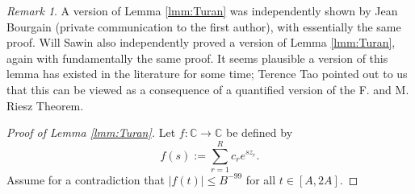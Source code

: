 \documentclass[12pt]{amsart}
\theoremstyle{plain}
\theoremstyle{definition}
\theoremstyle{remark}
\newtheorem{remark}[theorem]{Remark}
\begin{document}
%
%
%
%
\begin{remark}
A version of Lemma \ref{lmm:Turan} was independently shown by Jean Bourgain (private communication to the first author), with essentially the same proof. Will Sawin \cite{SawMO} also independently proved a version of Lemma \ref{lmm:Turan}, again with fundamentally the same proof. It seems plausible a version of this lemma has existed in the literature for some time; Terence Tao pointed out to us that this can be viewed as a consequence of a quantified version of the F. and M. Riesz Theorem. 
\end{remark}
%
%
%
%
\begin{proof}[Proof of Lemma \ref{lmm:Turan}]
Let $f:\mathbb{C}\rightarrow\mathbb{C}$ be defined by
\[
f(s):=\sum_{r=1}^R c_r e^{s z_r}.
\]
Assume for a contradiction that $|f(t)|\le B^{-99}$ for all $t\in [A,2A]$.


\end{proof}
\end{document}

